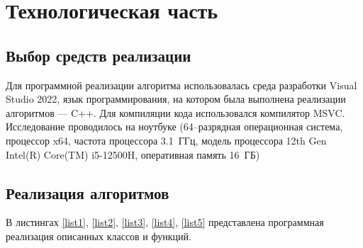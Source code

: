 \chapter{Технологическая часть}

\section{Выбор средств реализации}
Для программной реализации алгоритма использовалась среда разработки Visual Studio 2022, язык программирования, на котором была выполнена реализации алгоритмов --- C++.
Для компиляции кода использовался компилятор MSVC. Исследование проводилось на ноутбуке (64--разрядная операционная система, процессор x64, частота процессора 3.1~ГГц, модель процессора 12th Gen Intel(R) Core(TM) i5-12500H, оперативная память 16~ГБ)
\section{Реализация алгоритмов}
В листингах \ref{list1}, \ref{list2}, \ref{list3}, \ref{list4}, \ref{list5} представлена программная реализация описанных классов и функций.

